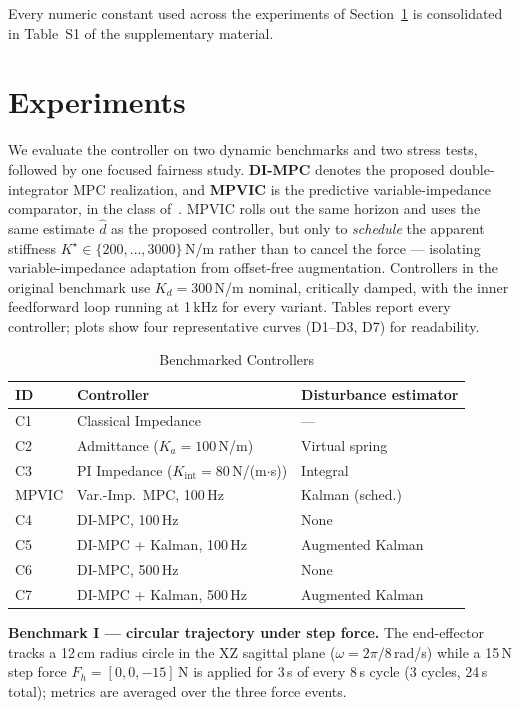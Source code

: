 \documentclass[journal]{IEEEtran}
\begin{document}
Every numeric constant used across the experiments of
Section~\ref{sec:experiments} is consolidated in Table~S1 of the
supplementary material.

\section{Experiments}\label{sec:experiments}

We evaluate the controller on two dynamic benchmarks and two stress
tests, followed by one focused fairness study. \textbf{DI-MPC} denotes the proposed double-integrator MPC
realization, and \textbf{MPVIC} is the predictive variable-impedance
comparator, in the class of~\cite{liu2025model,roveda2019optimal}. MPVIC
rolls out the same horizon and uses the same estimate $\hat d$ as the
proposed controller, but only to \emph{schedule} the apparent stiffness
$K^\star\in\{200,\dots,3000\}$\,N/m rather than to cancel the force ---
isolating variable-impedance adaptation from offset-free augmentation.
Controllers in the original benchmark use $K_d=300$\,N/m nominal, critically damped, with the
inner feedforward loop running at 1\,kHz for every variant. Tables
report every controller; plots show four representative curves
(D1--D3, D7) for readability.

\begin{table}[!t]
\caption{Benchmarked Controllers}
\label{tab:controllers}
\renewcommand{\arraystretch}{1.0}
\footnotesize
\begin{tabular}{lll}
\toprule
\textbf{ID} & \textbf{Controller} & \textbf{Disturbance estimator}\\
\midrule
C1 & Classical Impedance   & ---\\
C2 & Admittance ($K_a=100$\,N/m) & Virtual spring\\
C3 & PI Impedance ($K_{\text{int}}=80$\,N/(m$\cdot$s)) & Integral\\
MPVIC & Var.-Imp.\ MPC, 100\,Hz & Kalman (sched.)\\
C4 & DI-MPC, 100\,Hz    & None\\
C5 & DI-MPC + Kalman, 100\,Hz & Augmented Kalman\\
C6 & DI-MPC, 500\,Hz    & None\\
C7 & DI-MPC + Kalman, 500\,Hz & Augmented Kalman\\
\bottomrule
\end{tabular}
\end{table}

\textbf{Benchmark I --- circular trajectory under step force.}
The end-effector tracks a 12\,cm radius circle in the XZ sagittal plane
($\omega=2\pi/8$\,rad/s) while a 15\,N step force $F_h=[0,0,-15]$\,N is
applied for 3\,s of every 8\,s cycle (3 cycles, 24\,s total); metrics
are averaged over the three force events.
\end{document}
